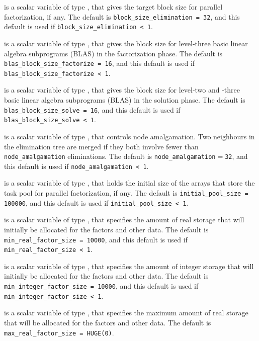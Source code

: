 \documentclass{galahad}
\begin{document}
\begin{description}
 is a scalar variable of type \integer,
that gives the target block size for parallel factorization, if any.
The default is {\tt block\_size\_elimination = 32},
and this default is used if {\tt block\_size\_\-elimination < 1}.

 is a scalar variable of type \integer,
that gives the block size for level-three basic linear algebra subprograms
(BLAS) in the factorization phase.
The default is {\tt blas\_block\_size\_factorize = 16},
and this default is used if {\tt blas\_block\_size\_factorize < 1}.

 is a scalar variable of type \integer,
that gives the block size for level-two and -three basic linear algebra
subprograms (BLAS) in the solution phase.
The default is {\tt blas\_block\_size\_solve = 16},
and this default is used if {\tt blas\_block\_size\_solve < 1}.

 is a scalar variable of type \integer,
that controls node amalgamation. Two neighbours in the elimination tree are
merged if they both involve fewer than {\tt node\_amalgamation} eliminations.
The default is {\tt node\_amalgamation$=$32}, and this default is used
if {\tt node\_amalgamation < 1}.

 is a scalar variable of type \integer,
that holds the initial size of the arrays that store the task pool for
parallel factorization, if any.
The default is {\tt initial\_pool\_size = 100000},
and this default is used if {\tt initial\_pool\_size < 1}.

 is a scalar variable of type \integer,
that specifies the amount of real storage that will initially be
allocated for the factors and other data.
The default is {\tt min\_real\_factor\_size = 10000},
and this default is used if {\tt min\_real\_factor\_size < 1}.

 is a scalar variable of type \integer,
that specifies the amount of integer storage that will initially be
allocated for the factors and other data.
The default is {\tt min\_integer\_factor\_size = 10000},
and this default is used if {\tt min\_integer\_factor\_size < 1}.

 is a scalar variable of type \longinteger,
that specifies the maximum amount of real storage that will be
allocated for the factors and other data.
The default is {\tt max\_real\_factor\_size = HUGE(0)}.


\end{description}
\end{document}
